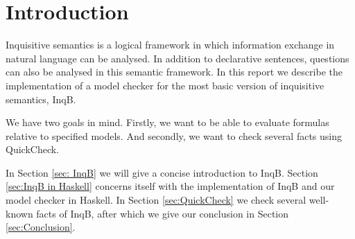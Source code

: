 \section{Introduction}\label{sec: Introduction}
Inquisitive semantics is a logical framework in which information exchange in natural language can be analysed. In addition to declarative sentences, questions can also be analysed in this semantic framework. In this report we describe the implementation of a model checker for the most basic version of inquisitive semantics, \textsf{InqB}.

We have two goals in mind. Firstly, we want to be able to evaluate formulas relative to specified models. And secondly, we want to check several facts using QuickCheck.

In Section \ref{sec: InqB} we will give a concise introduction to \textsf{InqB}. Section \ref{sec:InqB in Haskell} concerns itself with the implementation of \textsf{InqB} and our model checker in Haskell. In Section \ref{sec:QuickCheck} we check several well-known facts of \textsf{InqB}, after which we give our conclusion in Section \ref{sec:Conclusion}.


